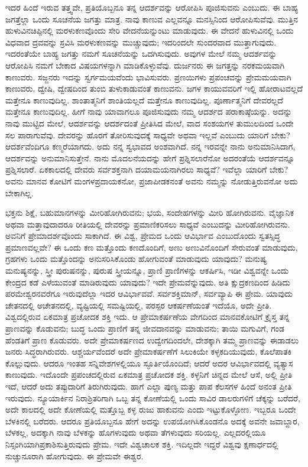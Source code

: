 ಇದರ ಹಿಂದೆ ಇರುವ ತತ್ತ್ವವೇ, ಪ್ರತಿಯೊಬ್ಬನೂ ತನ್ನ ಆದರ್ಶವನ್ನು ಆರೋಪಿಸಿ ಪೂಜಿಸುವನು ಎಂಬುದು. ಈ ಬಾಹ್ಯ ಜಗತ್ತೆಲ್ಲಾ ಒಂದು ಸೂಚನೆಯ ಜಗತ್ತು ಮಾತ್ರ. ನಾವು ಕಾಣುವ ಎಲ್ಲವನ್ನೂ ಮನಸ್ಸಿನಿಂದ ಆರೋಪಿಸುವೆವು. ಮುತ್ತಿನ ಹುಳುವಿನ\break ಚಿಪ್ಪಿನಲ್ಲಿ ಮರಳುಕಣವೊಂದು ಸೇರಿ ವೇದನೆಯನ್ನುಂಟು ಮಾಡುವುದು. ಈ ವೇದನೆ ಹುಳುವಿನಲ್ಲಿ ಒಂದು ವಿಧವಾದ ದ್ರವವನ್ನು ಸ್ರವಿಸಿ ಮರಳುಕಣವನ್ನು ಮುಚ್ಚುವುದು; ಇದರಿಂದಲೇ ಸುಂದರವಾದ ಮುತ್ತಾಗುವುದು. ಇದರಂತೆಯೇ ಬಾಹ್ಯ ಜಗತ್ತು ನಮಗೆ ಸೂಚನೆಯನ್ನು ಒದಗಿಸುವುದು. ಅವುಗಳ ಮೇಲೆ ನಮ್ಮ ಆದರ್ಶವನ್ನು ಆರೋಪಿಸಿ ನಮಗೆ ಬೇಕಾದ ವಿಷಯ\-ಗಳನ್ನಾಗಿ ಮಾಡಿಕೊಳ್ಳುವೆವು. ದುರ್ಜನರು ಈ ಜಗತ್ತನ್ನು ನರಕಮಯವಾಗಿ ಕಾಣುವರು. ಸಜ್ಜನರು ಇದನ್ನು ಸ್ವರ್ಗಮಯವೆಂದು ಭಾವಿಸುವರು. ಪ್ರಣಯಿಗಳು ಪ್ರಪಂಚವನ್ನು ಪ್ರೇಮಮಯವಾಗಿ ಕಾಣುವರು. ದ್ವೇಷಿ, ದ್ವೇಷದಿಂದ ತುಂಬಿ ತುಳುಕಾಡುವಂತೆ ಕಾಣುವನು. ಜಗಳ ಕಾಯುವವರಿಗೆ ಇಲ್ಲಿ ಹೋರಾಟವಲ್ಲದೆ ಮತ್ತೇನೂ ಕಾಣುವುದಿಲ್ಲ. ಶಾಂತಾತ್ಮನಿಗೆ ಶಾಂತಿಯಲ್ಲದೆ ಮತ್ತೇನೂ ಕಾಣುವುದಿಲ್ಲ. ಪೂರ್ಣಾತ್ಮನಿಗೆ ದೇವರಲ್ಲದೆ ಮತ್ತೇನೂ ಕಾಣುವುದಿಲ್ಲ. ಹೀಗೆ ನಾವು ಯಾವಾಗಲೂ ಪೂಜಿಸುವುದು ನಮ್ಮ ಆದರ್ಶದ ಪರಾಕಾಷ್ಠೆಯನ್ನು. ಅದನ್ನು ನಾವು ಮುಟ್ಟಿದ ಮೇಲೆ, ಆದರ್ಶವನ್ನು ಆದರ್ಶದಂತೆ ಪ್ರೀತಿಸಿದ ಮೇಲೆ, ವಾದ ಸಂಶಯಗಳ ತುಮುಲದಿಂದ ಒಂದೇ ಸಲ ಪಾರಾಗುವೆವು. ದೇವರನ್ನು ಹೊರಗೆ ತೋರಿಸುವುದಕ್ಕೆ ಸಾಧ್ಯವೇ ಅಥವಾ ಇಲ್ಲವೆ ಎಂಬುದು ಯಾರಿಗೆ ಬೇಕು? ಆದರ್ಶವೆಂದಿಗೂ ಕಣ್ಮರೆಯಾಗದು. ಅದು ನನ್ನ ಸ್ವಭಾವದ ಅಂಶವಾಗಿದೆ. ನನ್ನ ಇರವನ್ನೇ ನಾನು ಅನುಮಾನಿಸಿದಾಗ, ಆದರ್ಶವನ್ನು ಅನುಮಾನಿಸುತ್ತೇನೆ. ನಾನು ಮೊದಲ\-ನೆಯದನ್ನು ಹೇಗೆ ಪ್ರಶ್ನಿಸಲಾರೆನೋ ಅದರಂತೆಯೆ ಆದರ್ಶವನ್ನೂ ಪ್ರಶ್ನಿಸಲಾರೆ. ಏಕಕಾಲದಲ್ಲಿ ದೇವರು ಸರ್ವಶಕ್ತನಾಗಿ ದಯಾಮಯನಾಗಿರಲು ಸಾಧ್ಯವೆ? ಇವೆಲ್ಲಾ ಯಾರಿಗೆ ಬೇಕು? ಅವನು ಮಾನವ ಕೋಟಿಗೆ ಮಂಗಳಪ್ರದಾಯಕನೋ, ಪ್ರಜಾಪೀಡಕನಂತೆ ಅವನು ನಮ್ಮನ್ನು ನೋಡುತ್ತಿರುವನೋ ಅದು ಬೇಕಾಗಿಲ್ಲ.

ಭಕ್ತನು ಶಿಕ್ಷೆ, ಬಹುಮಾನಗಳನ್ನು ಮೀರಿಹೋಗಿರುವನು; ಭಯ, ಸಂದೇಹಗಳನ್ನು ಮೀರಿ ಹೋಗಿರುವನು. ವೈಜ್ಞಾನಿಕ ಅಥವಾ ಮತ್ತಾವುದಾದರೂ ರೀತಿಯಲ್ಲಿ ದೇವರನ್ನು ಪ್ರಮಾಣಿಕರಿಸಲು ಸಾಧ್ಯವೆ ಎಂಬುದನ್ನು ಮೀರಿಹೋಗಿರುವನು. ಅವನಿಗೆ ಪ್ರೇಮಾದರ್ಶ\-ವೊಂದು ಸಾಕಾಗಿದೆ. ಈ ವಿಶ್ವ, ಪ್ರೇಮದ ಒಂದು ಆವಿರ್ಭಾವ ಎಂಬುದೊಂದು ಸ್ವತಸ್ಸಿದ್ಧ ಪ್ರಮಾಣವಲ್ಲವೇ? ಈ ಒಂದು ಕಣ ಮತ್ತೊಂದು ಕಣದೊಂದಿಗೆ, ಅಣು ಅಣುವಿನೊಂದಿಗೆ ಸೇರುವಂತೆ ಮಾಡುವುದು, ಗ್ರಹಗಳು ಒಂದು ಮತ್ತೊಂದನ್ನು ಅನುಸರಿಸಿಕೊಂಡು ಹೋಗುವಂತೆ ಮಾಡುವುದು ಯಾವುದು? ಮನುಷ್ಯ ಮನುಷ್ಯನನ್ನು, ಸ್ತ್ರೀ ಪುರುಷನನ್ನು, ಪುರುಷ ಸ್ತ್ರೀಯನ್ನೂ, ಪ್ರಾಣಿ ಪ್ರಾಣಿಗಳನ್ನು ಆಕರ್ಷಿಸಿ, ಇಡೀ ವಿಶ್ವವನ್ನೇ ಒಂದು ಕೇಂದ್ರದ ಕಡೆ ಎಳೆಯುವಂತೆ ಮಾಡಿರುವುದು ಯಾವುದು? ಇದೇ ಪ್ರೇಮವೆನ್ನುವುದು. ಅತಿ ಕ್ಷುದ್ರಕಣದಿಂದ ಹಿಡಿದು ಪರಮೇಶ್ವರನವರೆಗೂ ಇರುವುದೆಲ್ಲಾ ಇದರ ಆವಿರ್ಭಾವವೆ. ಸರ್ವಶಕ್ತಿಮಾನ್​, ಸರ್ವವ್ಯಾಪಿ ಈ ಪ್ರೇಮ. ಯಾವುದು ಚೇತನದಲ್ಲಿ ಅಚೇತನದಲ್ಲಿ, ವ್ಯಷ್ಟಿಯಲ್ಲಿ ಸಮಷ್ಟಿಯಲ್ಲಿ, ಪರಸ್ಪರ ಆಕರ್ಷಣೆಯಂತೆ ಇದೆಯೊ, ಅದೇ ಪ್ರೀತಿ. ವಿಶ್ವದಲ್ಲಿರುವ ಏಕಮಾತ್ರ ಪ್ರಚೋದಕ ಶಕ್ತಿ ಇದು. ಆ ಪ್ರೇಮಾಕರ್ಷಣೆಯ ವೇಗದಿಂದ ಮಾನವ\-ಕೋಟಿಗೆ ಕ್ರೈಸ್ತ ತನ್ನ ಪ್ರಾಣವನ್ನು ಕೊಡುವನು; ಬುದ್ಧ ಒಂದು ಪ್ರಾಣಿಗೆ ತನ್ನ ಜೀವದಾನವನ್ನು ಮಾಡುವನು; ತಾಯಿ ಮಗುವಿಗೆ, ಗಂಡ ಹೆಂಡತಿಗೆ ಪ್ರಾಣ ಕೊಡುವರು. ಅದೇ ಪ್ರೇಮಾಕರ್ಷಣದ ಉದ್ವೇಗದಿಂದಲೇ, ದೇಶಕ್ಕಾಗಿ ತಮ್ಮ ಪ್ರಾಣವನ್ನು ಈಡಾಡಲು ಜನರು ಸಿದ್ಧರಾಗಿರುವರು. ಆಶ್ಚರ್ಯವೆಂದರೆ ಅದೇ ಪ್ರೇಮಾಕರ್ಷಣೆಗೆ ಸಿಲುಕಿಯೇ ಕಳ್ಳ\break ಕದಿಯುವುದು, ಕೊಲೆಪಾತಕಿ ಕೊಲ್ಲುವುದು. ಆದರೂ ಇಂತಹ ಸನ್ನಿವೇಶಗಳಲ್ಲಿಯೂ ಸ್ಫೂರ್ತಿಯೊಂದಿದೆ; ಆದರೆ ಅದರ ಆವಿರ್ಭಾವದಲ್ಲಿ ವ್ಯತ್ಯಾಸ ಕಾಣುವುದು. ಇದೊಂದೇ ಪ್ರಪಂಚದಲ್ಲಿರುವ ಏಕಮಾತ್ರ ಪ್ರಚೋದಕ ಶಕ್ತಿ. ಕಳ್ಳನಿಗೆ ಚಿನ್ನದ ಮೇಲೆ ಆಸೆ, ಅಲ್ಲಿ ಪ್ರೀತಿ ಇದೆ, ಆದರೆ ಅದು ತಪ್ಪುದಾರಿಗೆ ತಿರುಗಿರುವುದು. ಹಾಗೆ ಎಲ್ಲಾ ಪುಣ್ಯ ಮತ್ತು ಪಾಪ ಕೆಲಸಗಳ ಹಿಂದೆ ಅನಂತ ಪ್ರೀತಿ ಇರುವುದು. ನ್ಯೂಯಾರ್ಕಿನ ನಿರಾಶ್ರಿತರಿಗಾಗಿ ಒಬ್ಬ ತನ್ನ ಕೋಣೆಯಲ್ಲಿ ಒಂದು ಸಾವಿರ ಡಾಲರುಗಳಿಗೆ ಚೆಕ್ಕನ್ನು ಬರೆದರೆ, ಅದೇ ಕಾಲದಲ್ಲಿ ಅದೇ ಕೋಣೆಯಲ್ಲಿ ಮತ್ತೊಬ್ಬ ಕಳ್ಳ ರುಜು ಹಾಕುವನು ಎಂದು ಇಟ್ಟುಕೊಳ್ಳೋಣ. ಇಬ್ಬರೂ ಒಂದೇ ಬೆಳಕಿನಲ್ಲಿ ಬರೆದರು. ಆದರೂ ಪ್ರತಿಯೊಬ್ಬನೂ ಹೇಗೆ ಅದನ್ನು ಉಪಯೋಗಿಸಿಕೊಂಡನೊ ಅದಕ್ಕೆ ಅವನೇ ಜವಾಬ್ದಾರ, ಬೆಳಕಲ್ಲ, ಅದಕ್ಕಾಗಿ ನಾವು ಬೆಳಕನ್ನು ಹೊಗಳುವುದು ಅಥವಾ ತೆಗಳುವುದು ಸರಿಯಲ್ಲ. ಎಲ್ಲದರಲ್ಲಿಯೂ ನಿಸ್ಸಂಗಿಯಾಗಿ\break ಪ್ರಕಾಶಿಸುತ್ತಿರುವುದು ಪ್ರೇಮ. ಇದೇ ವಿಶ್ವಚಾಲಕ ಶಕ್ತಿ. ಇದಿಲ್ಲದೇ ಇದ್ದರೆ ವಿಶ್ವವು ಕ್ಷಣಾರ್ಧದಲ್ಲಿ ನುಚ್ಚುನೂರಾಗಿ ಹೋಗುವುದು. ಈ ಪ್ರೇಮವೇ ಈಶ್ವರ.

